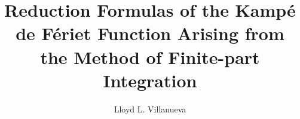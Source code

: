 \documentclass[final]{nip} %
\title{Reduction Formulas of the Kampé de Fériet Function Arising from the Method of Finite-part Integration}
\author{Lloyd L. Villanueva} %
\begin{document}
 

\maketitle %
\makePrelim %
\newtheorem{theorem}{Theorem}[chapter]
\newtheorem{lemma}{Lemma}
\newtheorem{corollary}{Corollary}[theorem]
\newtheorem{proposition}{Proposition}[chapter]
\pagestyle{fancy}
\setlength{\headsep}{20pt}




%










%

\appendix

\end{document}
